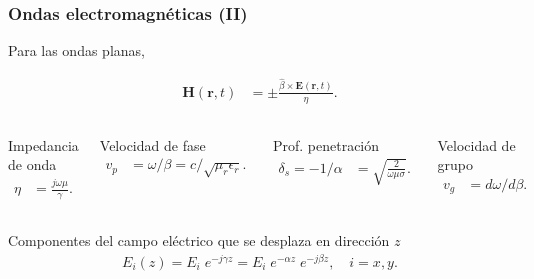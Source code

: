 \documentclass{beamer}
\renewcommand{\vec}[1]{\boldsymbol{#1}}
\begin{document}
		\begin{frame}
		\frametitle{Ondas electromagnéticas (II)}
		
		Para las ondas planas,
		
		\begin{block}{}
			\setlength\abovedisplayskip{0pt}
			\begin{align*}
			\vec{H}(\vec{r},t) &= \pm \frac{\hat{\beta} \times \vec{E}(\vec{r},t)}{\eta}.
			\end{align*}
		\end{block}
	
	
	
		\begin{columns}[c] %
			
			
			\begin{block}{Impedancia de onda}
				\setlength\abovedisplayskip{0pt}
				\begin{align*}
				\eta &= \frac{j \omega \mu}{\gamma }.
				\end{align*}
			\end{block}
		
			\begin{block}{Velocidad de fase}
				\setlength\abovedisplayskip{0pt}
				\begin{align*}
				v_p &= \omega/\beta = c/\sqrt{\mu_r \epsilon_r}.
				\end{align*}
			\end{block}
		
			
			
			
			\begin{block}{Prof. penetración}
				\setlength\abovedisplayskip{0pt}
				\begin{align*}
				\label{eq:prof_penetacion}
				\delta_s = -1/\alpha &= \sqrt{\frac{2}{\omega \mu \sigma}}.
				\end{align*}
			\end{block}
		
			\begin{block}{Velocidad de grupo}
				\setlength\abovedisplayskip{0pt}
				\begin{align*}
				v_g &= d\omega/d\beta.
				\end{align*}
			\end{block}
		
		\end{columns}
		
		\begin{block}{Componentes del campo eléctrico que se desplaza en dirección $z$}
			\setlength\abovedisplayskip{0pt}
			\begin{align*}
			E_i(z) = E_i \; e^{-j\gamma z} = E_i \; e^{-\alpha z} \; e^{-j \beta z}, \quad i=x,y.
			\end{align*}
		\end{block}

		\end{frame}
		
\end{document}
